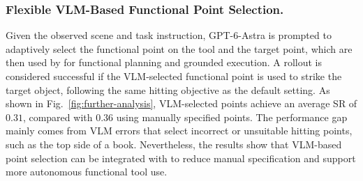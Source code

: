 \subsubsection{Flexible VLM-Based Functional Point Selection.}
Given the observed scene and task instruction, GPT-6-Astra is prompted to adaptively select the functional point on the tool and the target point, which are then used by \algoname{} for functional planning and grounded execution.
A rollout is considered successful if the VLM-selected functional point is used to strike the target object, following the same hitting objective as the default setting.
As shown in Fig.~\ref{fig:further-analysis}, VLM-selected points achieve an average SR of $0.31$, compared with $0.36$ using manually specified points.
The performance gap mainly comes from VLM errors that select incorrect or unsuitable hitting points, such as the top side of a book.
Nevertheless, the results show that VLM-based point selection can be integrated with \algoname{} to reduce manual specification and support more autonomous functional tool use.
